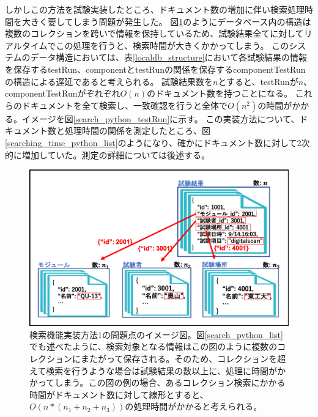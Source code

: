 しかしこの方法を試験実装したところ、ドキュメント数の増加に伴い検索処理時間を大きく要してしまう問題が発生した。
図\ref{search_python_list_problem}のようにデータベース内の構造は複数のコレクションを跨いで情報を保持しているため、試験結果全てに対してリアルタイムでこの処理を行うと、検索時間が大きくかかってしまう。
このシステムのデータ構造においては、表\ref{localdb_structure}において各試験結果の情報を保存するtestRun、componentとtestRunの関係を保存するcomponentTestRunの構造による遅延であると考えられる。
試験結果数を$n$とすると、testRunが$n$、componentTestRunがぞれぞれ$O(n)$のドキュメント数を持つことになる。
これらのドキュメントを全て検索し、一致確認を行うと全体で$O(n^2)$の時間がかかる。イメージを図\ref{search_python_testRun}に示す。
この実装方法について、ドキュメント数と処理時間の関係を測定したところ、図\ref{searching_time_python_list}のようになり、確かにドキュメント数に対して2次的に増加していた。測定の詳細については後述する。
\begin{figure}[bpt]
  \begin{center}
    \includegraphics[width=12cm]{./search_python_list_problem.png}
  \caption[検索機能実装方法1の問題点]
{検索機能実装方法1の問題点のイメージ図。図\ref{search_python_list}でも述べたように、検索対象となる情報はこの図のように複数のコレクションにまたがって保存される。そのため、コレクションを超えて検索を行うような場合は試験結果の数以上に、処理に時間がかかってしまう。この図の例の場合、あるコレクション検索にかかる時間がドキュメント数に対して線形とすると、$O(n*(n_1+n_2+n_3))$の処理時間がかかると考えられる。}
  \label{search_python_list_problem}
  \end{center}
\end{figure}

